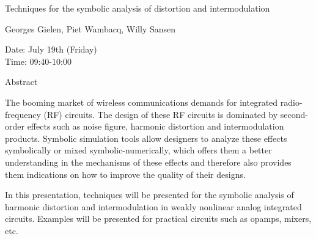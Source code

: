 \begin{center}
\LARGE
Techniques for the symbolic analysis of distortion and intermodulation

\end{center}

\begin{center}
\Large
Georges Gielen,  Piet Wambacq, Willy Sansen
\end{center}

\noindent
Date:  July 19th (Friday) \\
Time: 09:40-10:00\\

\begin{center}
\large
Abstract
\end{center}

The booming market of wireless communications demands for integrated
radio-frequency (RF) circuits. The design of these RF circuits is
dominated by second-order effects such as noise figure, harmonic 
distortion and intermodulation products. Symbolic simulation tools
allow designers to analyze these effects symbolically or mixed
symbolic-numerically, which offers them a better understanding in the
mechanisms of these effects and therefore also provides them indications
on how to improve the quality of their designs.

In this presentation, techniques will be presented for the symbolic
analysis of harmonic distortion and intermodulation in weakly nonlinear
analog integrated circuits. Examples will be presented for practical
circuits such as opamps, mixers, etc.



